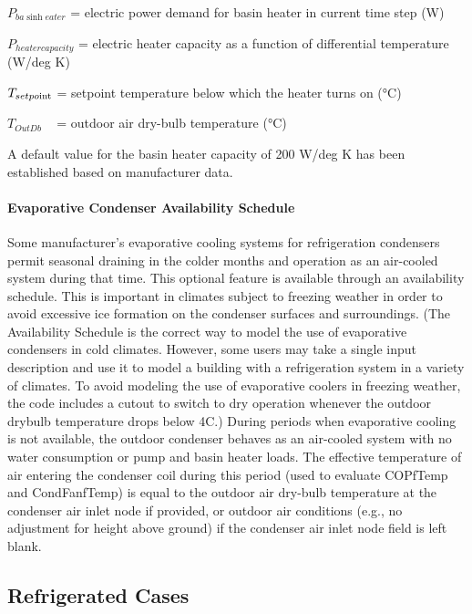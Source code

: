 \({P_{ba\sinh eater}}\) = electric power demand for basin heater in current time step (W)

\({P_{heatercapacity}}\) = electric heater capacity as a function of differential temperature (W/deg K)

\({T_{setpo{\mathop{\rm int}} }}\) = setpoint temperature below which the heater turns on (°C)

\({T_{OutDb}}\) ~ = outdoor air dry-bulb temperature (°C)

A default value for the basin heater capacity of 200 W/deg K has been established based on manufacturer data.

\paragraph{Evaporative Condenser Availability Schedule}\label{evaporative-condenser-availability-schedule}

Some manufacturer's evaporative cooling systems for refrigeration condensers permit seasonal draining in the colder months and operation as an air-cooled system during that time. This optional feature is available through an availability schedule. This is important in climates subject to freezing weather in order to avoid excessive ice formation on the condenser surfaces and surroundings. (The Availability Schedule is the correct way to model the use of evaporative condensers in cold climates. However, some users may take a single input description and use it to model a building with a refrigeration system in a variety of climates. To avoid modeling the use of evaporative coolers in freezing weather, the code includes a cutout to switch to dry operation whenever the outdoor drybulb temperature drops below 4C.) During periods when evaporative cooling is not available, the outdoor condenser behaves as an air-cooled system with no water consumption or pump and basin heater loads. The effective temperature of air entering the condenser coil during this period (used to evaluate COPfTemp and CondFanfTemp) is equal to the outdoor air dry-bulb temperature at the condenser air inlet node if provided, or outdoor air conditions (e.g., no adjustment for height above ground) if the condenser air inlet node field is left blank.

\subsection{Refrigerated Cases}\label{refrigerated-cases}

